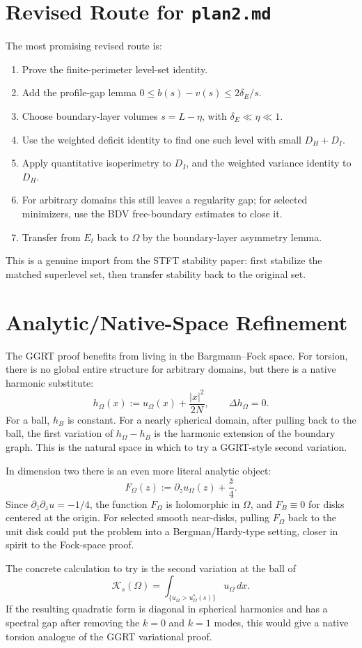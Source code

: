 \documentclass[11pt]{article}
\begin{document}
\section{Revised Route for \texttt{plan2.md}}

The most promising revised route is:
\begin{enumerate}
\item Prove the finite-perimeter level-set identity.
\item Add the profile-gap lemma \(0\le b(s)-v(s)\le 2\delta_E/s\).
\item Choose boundary-layer volumes \(s=L-\eta\), with
\(\delta_E\ll\eta\ll1\).
\item Use the weighted deficit identity to find one such level with small
\(D_H+D_I\).
\item Apply quantitative isoperimetry to \(D_I\), and the weighted variance
identity to \(D_H\).
\item For arbitrary domains this still leaves a regularity gap; for selected
minimizers, use the BDV free-boundary estimates to close it.
\item Transfer from \(E_t\) back to \(\Omega\) by the boundary-layer asymmetry
lemma.
\end{enumerate}
This is a genuine import from the STFT stability paper: first stabilize the
matched superlevel set, then transfer stability back to the original set.

\section{Analytic/Native-Space Refinement}

The GGRT proof benefits from living in the Bargmann--Fock space. For torsion,
there is no global entire structure for arbitrary domains, but there is a
native harmonic substitute:
\[
h_\Omega(x):=u_\Omega(x)+\frac{|x|^2}{2N},
\qquad
\Delta h_\Omega=0.
\]
For a ball, \(h_B\) is constant. For a nearly spherical domain, after pulling
back to the ball, the first variation of \(h_\Omega-h_B\) is the harmonic
extension of the boundary graph. This is the natural space in which to try a
GGRT-style second variation.

In dimension two there is an even more literal analytic object:
\[
F_\Omega(z):=\partial_z u_\Omega(z)+\frac{\bar z}{4}.
\]
Since \(\partial_{\bar z}\partial_z u=-1/4\), the function \(F_\Omega\) is
holomorphic in \(\Omega\), and \(F_B\equiv0\) for disks centered at the origin.
For selected smooth near-disks, pulling \(F_\Omega\) back to the unit disk could
put the problem into a Bergman/Hardy-type setting, closer in spirit to the
Fock-space proof.

The concrete calculation to try is the second variation at the ball of
\[
\mathcal K_s(\Omega)
=
\int_{\{u_\Omega>u_\Omega^*(s)\}}u_\Omega\,dx.
\]
If the resulting quadratic form is diagonal in spherical harmonics and has a
spectral gap after removing the \(k=0\) and \(k=1\) modes, this would give a
native torsion analogue of the GGRT variational proof.
\end{document}
